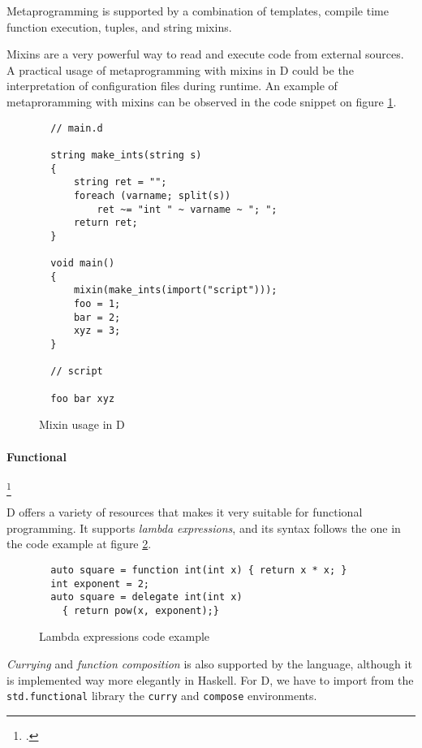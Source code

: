 Metaprogramming is supported by a combination of templates, compile time function execution, tuples, and string mixins.

Mixins are a very powerful way to read and execute code from external sources. A practical usage of metaprogramming with mixins in D could be the interpretation of configuration files during runtime. An example of metaproramming with mixins can be observed in the code snippet on figure \ref{fig:mixin_usage_in_D}.

\begin{figure}
  \caption{Mixin usage in D}
  \label{fig:mixin_usage_in_D}
  \begin{lstlisting}
  // main.d

  string make_ints(string s)
  {
      string ret = "";
      foreach (varname; split(s))
          ret ~= "int " ~ varname ~ "; ";
      return ret;
  }

  void main()
  {
      mixin(make_ints(import("script")));
      foo = 1;
      bar = 2;
      xyz = 3;
  }

  // script

  foo bar xyz
  \end{lstlisting}
\end{figure}

\paragraph{Functional}\footcite{functional_programming_in_d}

D offers a variety of resources that makes it very suitable for functional programming.
It supports \emph{lambda expressions}, and its syntax follows the one in the code example at figure \ref{fig:lambda_expressions_code_example}.

\begin{figure}
  \caption{Lambda expressions code example}
  \label{fig:lambda_expressions_code_example}
  \begin{lstlisting}
  auto square = function int(int x) { return x * x; }
  int exponent = 2;
  auto square = delegate int(int x)
    { return pow(x, exponent);}
  \end{lstlisting}
\end{figure}

\emph{Currying} and \emph{function composition} is also supported by the language, although it is implemented way more elegantly in Haskell. For D, we have to import from the \texttt{std.functional} library the \texttt{curry} and \texttt{compose} environments.

